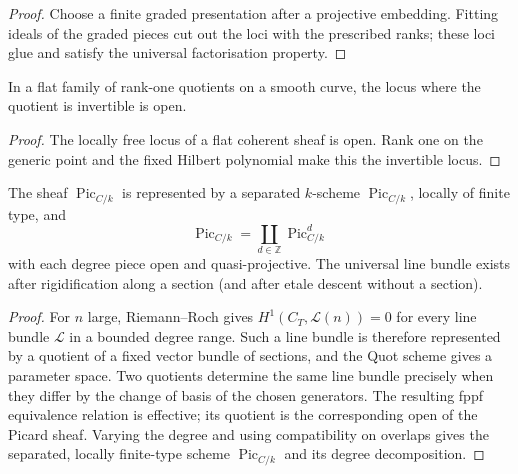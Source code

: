 \begin{proof}
  Choose a finite graded presentation after a projective embedding.  Fitting
  ideals of the graded pieces cut out the loci with the prescribed ranks;
  these loci glue and satisfy the universal factorisation property.
\end{proof}

\begin{lemma}
  \label{mk-lem-invertibility-open}
  \cite{kleiman-picard}
  In a flat family of rank-one quotients on a smooth curve, the locus where
  the quotient is invertible is open.
\end{lemma}

\begin{proof}
  The locally free locus of a flat coherent sheaf is open.  Rank one on the
  generic point and the fixed Hilbert polynomial make this the invertible locus.
\end{proof}

\begin{theorem}
  \label{mk-thm-picard-representability}
  \cite[Thm.~4.8]{kleiman-picard}
  The sheaf \(\operatorname{Pic}_{C/k}\) is represented by a separated
  \(k\)-scheme \(\operatorname{Pic}_{C/k}\), locally of finite type, and
  \[
    \operatorname{Pic}_{C/k}=\coprod_{d\in\mathbb Z}\operatorname{Pic}^d_{C/k}
  \]
  with each degree piece open and quasi-projective.  The universal line bundle
  exists after rigidification along a section (and after etale descent without
  a section).
\end{theorem}

\begin{proof}
  For \(n\) large, Riemann--Roch gives
  \(H^1(C_T,\mathcal L(n))=0\) for every line bundle \(\mathcal L\) in a
  bounded degree range.  Such a line bundle is therefore represented by a
  quotient of a fixed vector bundle of sections, and the Quot scheme gives a
  parameter space.  Two quotients determine the same line bundle precisely
  when they differ by the change of basis of the chosen generators.  The
  resulting fppf equivalence relation is effective; its quotient is the
  corresponding open of the Picard sheaf.  Varying the degree and using
  compatibility on overlaps gives the separated, locally finite-type scheme
  \(\operatorname{Pic}_{C/k}\) and its degree decomposition.
\end{proof}

